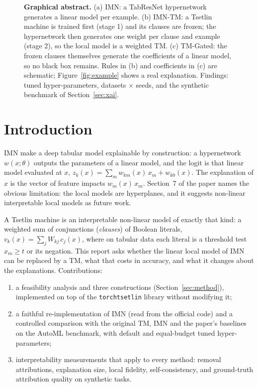 \documentclass[10pt,a4paper]{article}
\newcommand{\imn}{\textsc{IMN}}
\newcommand{\arm}[1]{\textsf{#1}}
\begin{document}
\begin{figure}[t]
  \centering
  \resizebox{\textwidth}{!}{\GraphicalAbstract}
  \caption{\textbf{Graphical abstract.} (a) \imn{}: a TabResNet hypernetwork generates a linear model per
  example. (b) \arm{IMN-TM}: a Tsetlin machine is trained first (stage 1) and its clauses are frozen; the
  hypernetwork then generates one weight per clause and example (stage 2), so the local model is a weighted
  TM. (c) \arm{TM-Gated}: the frozen clauses themselves generate the coefficients of a linear model, so no
  black box remains. Rules in (b) and coefficients in (c) are schematic; Figure~\ref{fig:example} shows a
  real explanation. Findings: tuned hyper-parameters, \HpoDatasets{} datasets $\times$ \HpoSeeds{} seeds, and the synthetic benchmark of Section~\ref{sec:xai}.}
  \label{fig:ga}
\end{figure}

\section{Introduction}
\imn{} \cite{kadra2024} make a deep tabular model explainable by construction: a hypernetwork
$w(x;\theta)$ outputs the parameters of a linear model, and the logit is that linear model evaluated at
$x$, $z_k(x)=\sum_m w_{km}(x)\,x_m + w_{k0}(x)$. The explanation of $x$ is the vector of feature impacts
$w_m(x)\,x_m$. Section~7 of the paper names the obvious limitation: the local models are hyperplanes, and
it suggests non-linear interpretable local models as future work.

A Tsetlin machine \cite{granmo2018} is an interpretable non-linear model of exactly that kind: a weighted
sum of conjunctions (\emph{clauses}) of Boolean literals, $v_k(x)=\sum_j W_{kj}\,c_j(x)$, where on tabular
data each literal is a threshold test $x_m\ge t$ or its negation. This report asks whether the linear
local model of \imn{} can be replaced by a TM, what that costs in accuracy, and what it changes about the
explanations. Contributions:
\begin{enumerate}
  \item a feasibility analysis and three constructions (Section~\ref{sec:method}), implemented on top of
        the \texttt{torchtsetlin} library without modifying it;
  \item a faithful re-implementation of \imn{} (read from the official code) and a controlled comparison
        with the original TM, \imn{} and the paper's baselines on the AutoML benchmark, with default and
        equal-budget tuned hyper-parameters;
  \item interpretability measurements that apply to every method: removal attributions, explanation
        size, local fidelity, self-consistency, and ground-truth attribution quality on synthetic tasks.
\end{enumerate}
\end{document}
